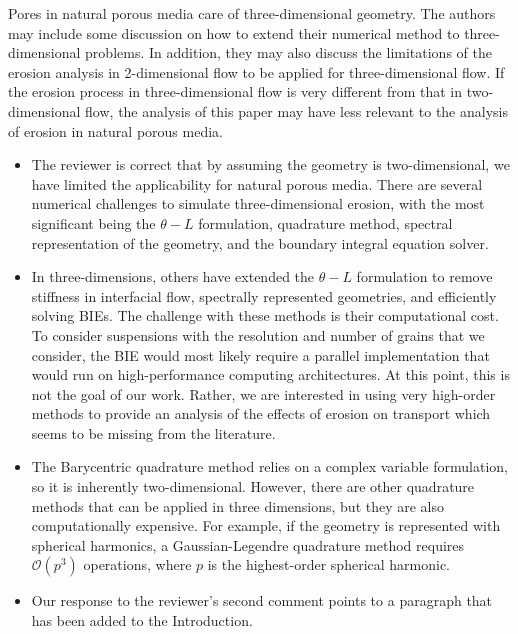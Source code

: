 \documentclass[11pt]{article}
\newcommand{\comment}[1]{{\color{blue} #1}}
\begin{document}
\noindent
\comment{Pores in natural porous media care of three-dimensional
geometry.  The authors may include some discussion on how to extend
their numerical method to three-dimensional problems.  In addition, they
may also discuss the limitations of the erosion analysis in
2-dimensional flow to be applied for three-dimensional flow. If the
erosion process in three-dimensional flow is very different from that in
two-dimensional flow, the analysis of this paper may have less relevant
to the analysis of erosion in natural porous media.}
\begin{itemize}
  \item The reviewer is correct that by assuming the geometry is
    two-dimensional, we have limited the applicability for natural
    porous media. There are several numerical challenges to simulate
    three-dimensional erosion, with the most significant being the
    $\theta-L$ formulation, quadrature method, spectral representation
    of the geometry, and the boundary integral equation solver.

  \item In three-dimensions, others have extended the $\theta-L$
    formulation to remove stiffness in interfacial flow, spectrally
    represented geometries, and efficiently solving BIEs.  The challenge
    with these methods is their computational cost. To consider
    suspensions with the resolution and number of grains that we
    consider, the BIE would most likely require a parallel
    implementation that would run on high-performance computing
    architectures. At this point, this is not the goal of our work.
    Rather, we are interested in using very high-order methods to
    provide an analysis of the effects of erosion on transport which
    seems to be missing from the literature.

  \item The Barycentric quadrature method relies on a complex variable
    formulation, so it is inherently two-dimensional. However, there are
    other quadrature methods that can be applied in three dimensions,
    but they are also computationally expensive. For example, if the
    geometry is represented with spherical harmonics, a
    Gaussian-Legendre quadrature method requires $\mathcal{O}(p^3)$
    operations, where $p$ is the highest-order spherical harmonic.

  \item Our response to the reviewer's second comment points to a
    paragraph that has been added to the Introduction.

\end{itemize}
\end{document}
